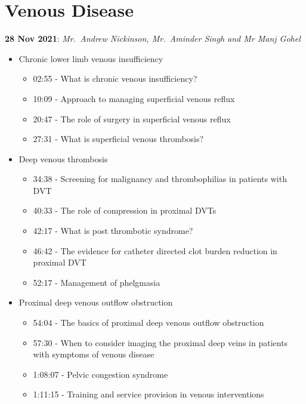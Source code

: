 \documentclass[
]{book}
\begin{document}
\hfill\break

\hypertarget{venous-disease}{%
\chapter{Venous Disease}\label{venous-disease}}

\textbf{28 Nov 2021}: \emph{Mr.~Andrew Nickinson, Mr.~Aminder Singh and Mr Manj
Gohel}

\begin{itemize}
\item
  Chronic lower limb venous insufficiency

  \begin{itemize}
  \item
    02:55 - What is chronic venous insufficiency?
  \item
    10:09 - Approach to managing superficial venous reflux
  \item
    20:47 - The role of surgery in superficial venous reflux
    \citep{brittendenRandomizedTrialComparing2014, gohelLongTermResults2007, gohelRandomizedTrialEarly2018}
  \item
    27:31 - What is superficial venous thrombosis?
  \end{itemize}
\item
  Deep venous thrombosis \citep{kakkosEditorChoiceEuropean2021}

  \begin{itemize}
  \item
    34:38 - Screening for malignancy and thrombophilias in patients
    with DVT
  \item
    40:33 - The role of compression in proximal DVTs
  \item
    42:17 - What is post thrombotic syndrome?
  \item
    46:42 - The evidence for catheter directed clot burden reduction
    in proximal DVT
    \citep{vedanthamPharmacomechanicalCatheterDirectedThrombolysis2017}
  \item
    52:17 - Management of phelgmasia
  \end{itemize}
\item
  Proximal deep venous outflow obstruction

  \begin{itemize}
  \item
    54:04 - The basics of proximal deep venous outflow obstruction
  \item
    57:30 - When to consider imaging the proximal deep veins in
    patients with symptoms of venous disease
  \item
    1:08:07 - Pelvic congestion syndrome
  \item
    1:11:15 - Training and service provision in venous interventions
  \end{itemize}
\end{itemize}
\end{document}
